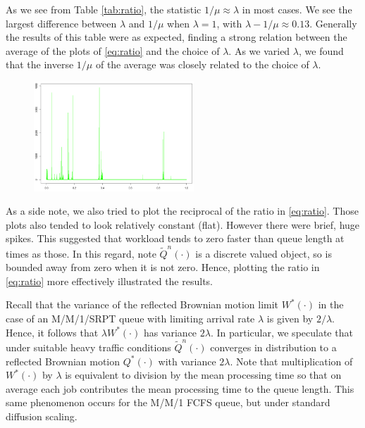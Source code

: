 \documentclass[12pt]{article}
\theoremstyle{plain}
\theoremstyle{definition}
\theoremstyle{remark}
\newcommand{\Qftild}{\widetilde{Q}^{n}(\cdot)}
\begin{document}
As we see from Table \ref{tab:ratio}, the statistic $1/\mu \approx \lambda$ in most cases. We see the largest difference between $\lambda$ and $1/\mu$ when $\lambda = 1$, with $\lambda - 1/\mu \approx 0.13$. Generally the results of this table were as expected, finding a strong relation between the average of the plots of \eqref{eq:ratio} and the choice of $\lambda$. As we varied $\lambda$, we found that the inverse $1/\mu$ of the average was closely related to the choice of $\lambda$.

\begin{minipage}[t]{6cm}
\begin{figure}[H]
\centering
\includegraphics[width=6cm]{Pictures/altRatio.png}
\label{fig:altRatio}
\end{figure}
\end{minipage}
\qquad
\begin{minipage}[t]{10cm}
\vspace*{\baselineskip}
As a side note, we also tried to plot the reciprocal of the ratio in \eqref{eq:ratio}.  Those plots also tended to look relatively constant (flat).  However there were brief, huge spikes.  This suggested that workload tends to zero faster than queue length at times as those.  In this regard, note $\Qftild$ is a discrete valued object, so is bounded away from zero when it is not zero.  Hence, plotting the ratio in \eqref{eq:ratio} more effectively illustrated the results.
\end{minipage}
\vspace*{\baselineskip}

Recall that the variance of the reflected Brownian motion limit $W^*(\cdot)$ in the case of an M/M/1/SRPT queue
with limiting arrival rate $\lambda$ is given by $2/\lambda$.  Hence, it follows that
$\lambda W^{*}(\cdot)$ has variance $2\lambda$.  In particular, we speculate that under suitable heavy traffic conditions
$\Qftild$ converges in distribution to a reflected Brownian motion $Q^*(\cdot)$ with variance $2\lambda$.
Note that multiplication of $W^*(\cdot)$ by $\lambda$ is equivalent to division by the mean processing time
so that on average each job contributes the mean processing time to the queue length.
This same phenomenon occurs for the M/M/1 FCFS queue, but under standard diffusion scaling.
\end{document}
